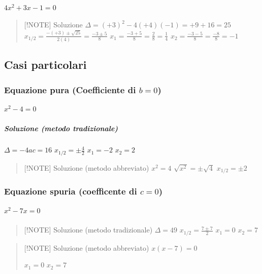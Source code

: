 \documentclass[
]{article}
\begin{document}
\hypertarget{x23x-10}{%
\paragraph{\texorpdfstring{\(4x^2+3x-1=0\)}{4x\^{}2+3x-1=0}}\label{x23x-10}}

\begin{quote}
{[}!NOTE{]} Soluzione \(\Delta = (+3)^2 - 4(+4)(-1) = +9+16 = 25\)
\(x_{1/2} = \frac{-(+3)\pm\sqrt{25}}{2(4)} = \frac{-3\pm5}{8}\)
\(x_1 = \frac{-3+5}{8} = \frac28 = \frac14\)
\(x_2 = \frac{-3-5}{8} = \frac{-8}{8} = -1\)
\end{quote}

\hypertarget{casi-particolari}{%
\subsection{Casi particolari}\label{casi-particolari}}

\hypertarget{equazione-pura-coefficiente-di-b-0}{%
\subsubsection{\texorpdfstring{Equazione pura (Coefficiente di
\(b =0\))}{Equazione pura (Coefficiente di b =0)}}\label{equazione-pura-coefficiente-di-b-0}}

\hypertarget{x2-40}{%
\subparagraph{\texorpdfstring{\(x^2-4=0\)}{x\^{}2-4=0}}\label{x2-40}}

\hypertarget{soluzione-metodo-tradizionale}{%
\subparagraph{Soluzione (metodo
tradizionale)}\label{soluzione-metodo-tradizionale}}

\(\Delta = -4ac = 16\) \(x_{1/2}=\pm\frac{4}{2}\) \(x_1 = -2\)
\(x_2 = 2\)

\begin{quote}
{[}!NOTE{]} Soluzione (metodo abbreviato) \(x^2 = 4\)
\(\sqrt{x^2} = \pm\sqrt4\) \(x_{1/2} = \pm2\)
\end{quote}

\hypertarget{equazione-spuria-coefficente-di-c0}{%
\subsubsection{\texorpdfstring{Equazione spuria (coefficente di
\(c=0\))}{Equazione spuria (coefficente di c=0)}}\label{equazione-spuria-coefficente-di-c0}}

\hypertarget{x2-7x0}{%
\subparagraph{\texorpdfstring{\(x^2-7x=0\)}{x\^{}2-7x=0}}\label{x2-7x0}}

\begin{quote}
{[}!NOTE{]} Soluzione (metodo tradizionale) \(\Delta = 49\)
\(x_{1/2}=\frac{7\pm7}{2}\) \(x_1 = 0\) \(x_2 = 7\)
\end{quote}

\begin{quote}
{[}!NOTE{]} Soluzione (metodo abbreviato) \(x(x-7) = 0\)

\(x_1 = 0\) \(x_2 = 7\)
\end{quote}
\end{document}
